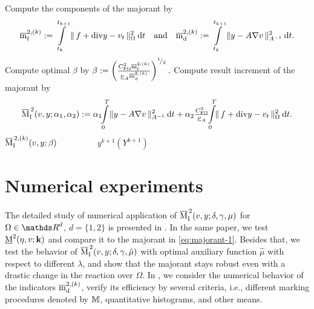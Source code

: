 \begin{algorithm}[!t]
\begin{algorithmic}
\vspace{3pt}
\STATE Compute the components of the majorant by %
$$
\overline{\mathrm m}^{2, (k)}_{\mathrm{f}} := \int\limits_{t_k}^{t_{k+1}} \| \, f + \mathrm{div} y - v_t  \, \|^2_{\Omega} \mathrm{\:d}t \quad {\rm and } \quad 
\overline{\mathrm m}^{2, ({k})}_{\mathrm{d}} := \int\limits_{t_k}^{t_{k+1}} \| y - A \nabla v \,\|^2_{A^{-1}} \mathrm{\:d}t.
$$
\vspace{-5pt}
\STATE Compute optimal $\beta$ by 
$
\beta := 
\left( \tfrac{C_{{\rm F}\Omega}^2 \overline{\mathrm m}^{2, (k)}_{\mathrm{f}} }{ \underline{\nu}_A \overline{\mathrm m}^{2, ({k})}_{\mathrm{d}}} \right)^{{}^{1}\!/_{2}}.
$
\ENDFOR
\vspace{5pt}
\STATE Compute result increment of the majorant by 
%
\begin{equation*}
\majone (v, y; \alpha_1, \alpha_2) 
	:= \alpha_1 \! \! \Int_0^T \! \| y - A \nabla v \,\|^2_{A^{-1}} \dt + 
		\alpha_2 \tfrac{\CFriedrichs^2}{\underline{\nu}_A}
		\!\! \Int_0^T  \!\! \| \, f + \dvrg y - v_t  \, \|^2_{\Omega} \dt.
		\label{eq:majorant-simplified-total-time}
\end{equation*}
%
 $\overline{\mathrm M}^{\,2, (k)}_{\mathrm{I}} (v, y; \beta)$ 
\STATE $\qquad \qquad$ $y^{k+1}(Y^{k+1})$ 
\end{algorithmic}
\end{algorithm}
%
\section{Numerical experiments}
\label{sec:numerical-example}

The detailed study of numerical application of $\overline{\mathrm M}^{\,2}_{\mathrm{I}} (v, y; \delta, \gamma, \mu)$ 
for $\Omega \in \Rd$, \linebreak $d = \{1, 2\}$ is presented in 
\cite{RefMatculevichRepin2014}. In the same paper, we test ${\underline{\mathrm M}^2} (\eta, v; {\bf k})$ and 
compare it to the majorant in \eqref{eq:majorant-1}. Besides that, 
we test the behavior of 
$\overline{\mathrm M}^{\,2}_{\mathrm{I}} (v, y; \delta, \gamma, \hat{\mu})$ with optimal auxiliary function $\hat{\mu}$ 
with respect to different $\lambda$, and show that the majorant stays 
robust even with a drastic change in the reaction over $\Omega$. 
In \cite[Examples 3--5]{RefMatculevichRepin2014}, we consider the numerical behavior of the
indicators $\overline{\mathrm m}^{2, ({k})}_{\mathrm{d}}$, verify its efficiency by several criteria, i.e., 
different marking procedures denoted by ${\mathbb M}$, quantitative histograms, and other means. 

